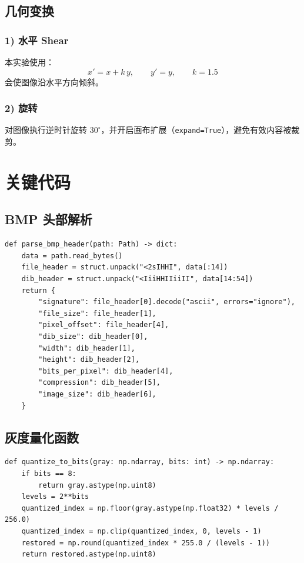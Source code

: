 \documentclass[UTF8,a4paper,12pt]{ctexart}
\begin{document}
\subsection{几何变换}
\subsubsection*{1) 水平 Shear}
本实验使用：
\begin{equation}
x'=x+k\,y,\qquad y'=y,\qquad k=1.5
\end{equation}
会使图像沿水平方向倾斜。

\subsubsection*{2) 旋转}
对图像执行逆时针旋转 $30^\circ$，并开启画布扩展（\texttt{expand=True}），避免有效内容被裁剪。

\section{关键代码}
\subsection{BMP 头部解析}
\begin{lstlisting}[style=py]
def parse_bmp_header(path: Path) -> dict:
    data = path.read_bytes()
    file_header = struct.unpack("<2sIHHI", data[:14])
    dib_header = struct.unpack("<IiiHHIIiiII", data[14:54])
    return {
        "signature": file_header[0].decode("ascii", errors="ignore"),
        "file_size": file_header[1],
        "pixel_offset": file_header[4],
        "dib_size": dib_header[0],
        "width": dib_header[1],
        "height": dib_header[2],
        "bits_per_pixel": dib_header[4],
        "compression": dib_header[5],
        "image_size": dib_header[6],
    }
\end{lstlisting}

\subsection{灰度量化函数}
\begin{lstlisting}[style=py]
def quantize_to_bits(gray: np.ndarray, bits: int) -> np.ndarray:
    if bits == 8:
        return gray.astype(np.uint8)
    levels = 2**bits
    quantized_index = np.floor(gray.astype(np.float32) * levels / 256.0)
    quantized_index = np.clip(quantized_index, 0, levels - 1)
    restored = np.round(quantized_index * 255.0 / (levels - 1))
    return restored.astype(np.uint8)
\end{lstlisting}
\end{document}
